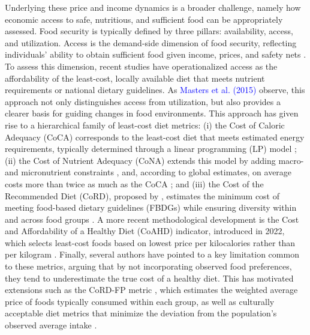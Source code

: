 \documentclass[Afour, sageh,times]{sagej}
\begin{document}
Underlying these price and income dynamics is a broader challenge, namely how economic access to safe, nutritious, and sufficient food can be appropriately assessed. Food security is typically defined by three pillars: availability, access, and utilization. Access is the demand-side dimension of food security, reflecting individuals' ability to obtain sufficient food given income, prices, and safety nets \citep{Barrett2010}. To assess this dimension, recent studies have operationalized access as the affordability of the least-cost, locally available diet that meets nutrient requirements or national dietary guidelines. As \textcolor{blue}{Masters et al. (2015)} observe, this approach not only distinguishes access from utilization, but also provides a clearer basis for guiding changes in food environments. This approach has given rise to a hierarchical family of least-cost diet metrics: (i) the Cost of Caloric Adequacy (CoCA) corresponds to the least-cost diet that meets estimated energy requirements, typically determined through a linear programming (LP) model \citep{Kachwaha2020, Mahrt2019}; (ii) the Cost of Nutrient Adequacy (CoNA) extends this model by adding macro- and micronutrient constraints \citep{Masters2018, Bai2020, dePee2021}, and, according to global estimates, on average costs more than twice as much as the CoCA \citep{Bai2020}; and (iii) the Cost of the Recommended Diet (CoRD), proposed by \citealt{Herforth2020}, estimates the minimum cost of meeting food-based dietary guidelines (FBDGs) while ensuring diversity within and across food groups \citep{Dizon2019}. A more recent methodological development is the Cost and Affordability of a Healthy Diet (CoAHD) indicator, introduced in 2022, which selects least-cost foods based on lowest price per kilocalories rather than per kilogram \citep{Herforth2022, Masters2025, Headey2024}. Finally, several authors have pointed to a key limitation common to these metrics, arguing that by not incorporating observed food preferences, they tend to underestimate the true cost of a healthy diet. This has motivated extensions such as the CoRD-FP metric \citep{Mahrt2019}, which estimates the weighted average price of foods typically consumed within each group, as well as culturally acceptable diet metrics that minimize the deviation from the population's observed average intake \citep{gurmu2019, Lauk2020}.

\smallskip
\end{document}
